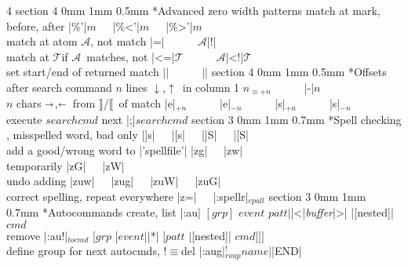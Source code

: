 \documentclass[10pt,a4paper,landscape]{article}
\makeatletter
\renewcommand{\section}{\@startsection		%
	{section}
	{3}
	{0mm}
	{1mm}
	{0.7mm}
	{\normalfont\bfseries\footnotesize}}
\renewcommand{\subsection}{\@startsection
	{section}
	{4}
	{0mm}
	{1mm}
	{0.5mm}
	{\normalfont\bfseries\scriptsize}}
\newcommand{\toleft}{$\shortleftarrow$}
\newcommand{\toright}{$\shortrightarrow$}
\newcommand{\up}{$\uparrow$}
\newcommand{\down}{$\downarrow$}
\newcommand{\ibeg}{$\llbracket$}
\newcommand{\iend}{$\rrbracket$}
\newcommand{\enbeg}[1]{\iend/\ibeg~of #1}
\newcommand{\eqv}[1]{$_{\equiv #1}$}
\newcommand{\opt}[1]{$_{#1}$}
\newcommand{\OPT}[2]{$_{#1}^{#2}$}
\newcommand{\A}{{\footnotesize$\mathcal{A}$}}
\newcommand{\T}{{\footnotesize$\mathcal{T}$}}
\newcommand{\w}{{~~~}}
\newcommand{\IND}{\hspace*{3cm}}
\newcommand{\next}{{\small\leftpointright}}
\newcommand{\prev}{{\small\rightpointleft}}
\makeatother
\begin{document}
\begin{multicols}{4}
\subsection*{Advanced zero width patterns}
match at mark, before, after	    \dotfill|\%'|$m$\w|\%<'|$m$\w|\%>'|$m$\\
match at atom \A, not match	    \dotfill\A|\@=|\w\w\A|\@!|\\
match at \T if \A~matches, not	    \dotfill\A|\@<=|\T\w\w\A|\@<!|\T\\
set start/end of returned match	    \dotfill|\zs|\w\w|\ze|
\subsection*{Offsets after search command}
$n$ lines \down,\up~in column 1	    \dotfill$n$\eqv{+n}\w\w|-|$n$\\
$n$ chars \toright,\toleft~from \enbeg{match}	\dotfill|e|\opt{+n}\w\w|e|\opt{-n}\w\w|s|\opt{+n}\w\w|s|\opt{-n}\\
execute $searchcmd$ next		    \dotfill|;|$searchcmd$
\section*{Spell checking}
\next, \prev misspelled word, bad only	\dotfill|]s|\w|[s|\w|]S|\w|[S|\\
add a good/wrong word to |'spellfile'|	\dotfill|zg|\w|zw|\\
{\IND}temporarily		    	\dotfill|zG|\w|zW|\\
undo adding				\dotfill|zuw|\w|zug|\w|zuW|\w|zuG|\\
correct spelling, repeat everywhere     \dotfill|z=|\w|:spellr|\opt{epall}
\section*{Autocommands}
create, list	\dotfill|:au| $[grp]$ $event$ $patt{\vert}$|<|\emph{buffer}|>| |[nested]| $cmd$\\
remove	\dotfill|:au!|\opt{tocmd} $[grp$ $[event{\vert}$|*| $[patt$ |[nested]| $cmd]]]$\\
define group for next autocmds, !$\equiv$del	\dotfill|:aug|\OPT{roup}{!}$name\vert$|END|

\end{multicols}
\end{document}

